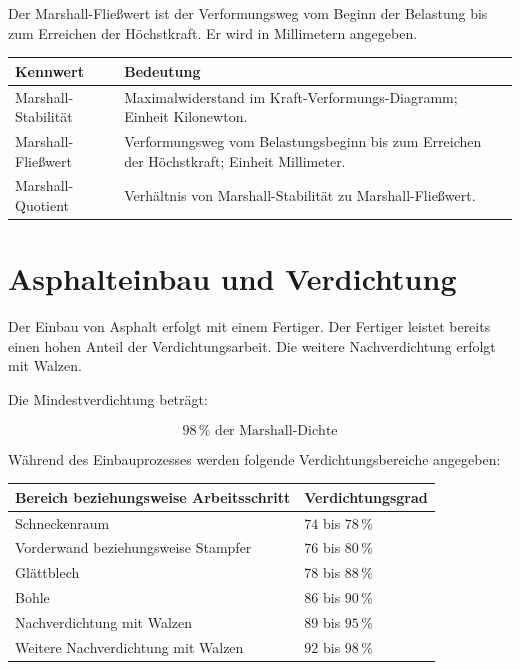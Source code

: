 \documentclass[
  12pt,
  a4paper,
  oneside
]{scrreprt}
\begin{document}
Der Marshall-Fließwert ist der Verformungsweg vom Beginn der Belastung
bis zum Erreichen der Höchstkraft. Er wird in Millimetern angegeben.


\begin{longtable}{
  >{\raggedright\arraybackslash}p{}
  >{\raggedright\arraybackslash}p{}
}
\toprule
\textbf{Kennwert} &
\textbf{Bedeutung} \\
\midrule
\endhead

Marshall-Stabilität &
Maximalwiderstand im Kraft-Verformungs-Diagramm; Einheit Kilonewton. \\

Marshall-Fließwert &
Verformungsweg vom Belastungsbeginn bis zum Erreichen der Höchstkraft;
Einheit Millimeter. \\

Marshall-Quotient &
Verhältnis von Marshall-Stabilität zu Marshall-Fließwert. \\

\bottomrule
\end{longtable}



\section{Asphalteinbau und Verdichtung}

Der Einbau von Asphalt erfolgt mit einem Fertiger. Der Fertiger leistet
bereits einen hohen Anteil der Verdichtungsarbeit. Die weitere
Nachverdichtung erfolgt mit Walzen.


Die Mindestverdichtung beträgt:

\begin{equation}
  98\,\%
  \text{ der Marshall-Dichte}
\end{equation}



Während des Einbauprozesses werden folgende Verdichtungsbereiche
angegeben:

\begin{longtable}{
  >{\raggedright\arraybackslash}p{}
  >{\centering\arraybackslash}p{}
}
\toprule
\textbf{Bereich beziehungsweise Arbeitsschritt} &
\textbf{Verdichtungsgrad} \\
\midrule
\endhead

Schneckenraum &
$74$ bis $78\,\%$ \\

Vorderwand beziehungsweise Stampfer &
$76$ bis $80\,\%$ \\

Glättblech &
$78$ bis $88\,\%$ \\

Bohle &
$86$ bis $90\,\%$ \\

Nachverdichtung mit Walzen &
$89$ bis $95\,\%$ \\

Weitere Nachverdichtung mit Walzen &
$92$ bis $98\,\%$ \\

\bottomrule
\end{longtable}
\end{document}
